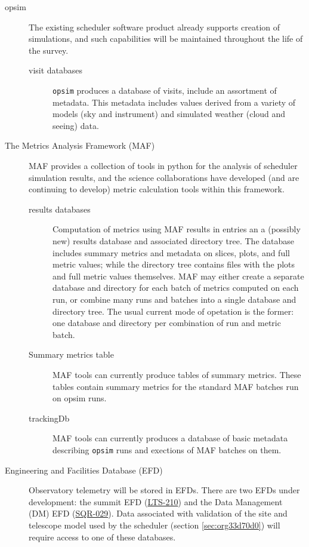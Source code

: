 \begin{description}
\item[{opsim}] The existing scheduler software product already supports creation of simulations, and such capabilities will be maintained throughout the life of the survey.
\begin{description}
\item[{visit databases}] \texttt{opsim} produces a database of visits, include an assortment of metadata. This metadata includes values derived from a variety of models (sky and instrument) and simulated weather (cloud and seeing) data.
\end{description}
\item[{The Metrics Analysis Framework (MAF)}] MAF provides a collection of tools in python for the analysis of scheduler simulation results, and the science collaborations have developed (and are continuing to develop) metric calculation tools within this framework. 
\begin{description}
\item[{results databases}] Computation of metrics using MAF results in entries an a (possibly new) results database and associated directory tree. The database includes summary metrics and metadata on slices, plots, and full metric values; while the directory tree contains files with the plots and full metric values themselves. MAF may either create a separate database and directory for each batch of metrics computed on each run, or combine many runs and batches into a single database and directory tree. The usual current mode of opetation is the former: one database and directory per combination of run and metric batch.
\item[{Summary metrics table}] MAF tools can currently produce tables of summary metrics. These tables contain summary metrics for the standard MAF batches run on opsim runs.
\item[{trackingDb}] MAF tools can currently produces a database of basic metadata describing \texttt{opsim} runs and exections of MAF batches on them.
\end{description}
\item[{Engineering and Facilities Database (EFD)}] Observatory telemetry will be stored in EFDs. There are two EFDs under development: the summit EFD (\href{https://ls.st/LTS-210}{LTS-210}) and the Data Management (DM) EFD (\href{https://sqr-029.lsst.io/}{SQR-029}).  Data associated with validation of the site and telescope model used by the scheduler (section \ref{sec:org33d70d0}) will require access to one of these databases.

\end{description}
